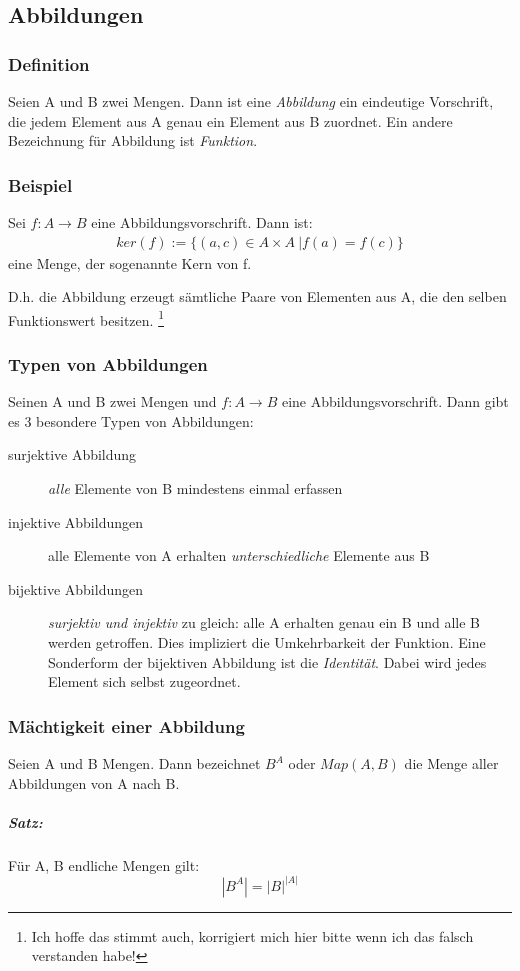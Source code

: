 \subsection{Abbildungen}

\subsubsection{Definition}
Seien A und B zwei Mengen.
Dann ist eine \emph{Abbildung} ein eindeutige Vorschrift, die jedem Element aus A genau ein Element aus B zuordnet.
Ein andere Bezeichnung für Abbildung ist \emph{Funktion}.
\subsubsection{Beispiel}
Sei $f:{A}\longrightarrow{B}$ eine Abbildungsvorschrift.
Dann ist:
\begin{align*}
   ker(f) := \{(a,c) \in A \times A\ | f(a)=f(c)\}
\end{align*}
eine Menge, der sogenannte Kern von f.

D.h. die Abbildung erzeugt sämtliche Paare von Elementen aus A, die den selben
Funktionswert besitzen. \footnote{Ich hoffe das stimmt auch, korrigiert mich hier bitte wenn
  ich das falsch verstanden habe!}
\newpage
\subsubsection{Typen von Abbildungen}
Seinen A und B zwei Mengen und $f:{A}\longrightarrow{B}$ eine Abbildungsvorschrift.
Dann gibt es 3 besondere Typen von Abbildungen:

\begin{description}
\item[surjektive Abbildung] \emph{alle} Elemente von B mindestens einmal erfassen
\item[injektive Abbildungen] alle Elemente von A erhalten \emph{unterschiedliche} Elemente aus B
\item[bijektive Abbildungen] \emph{surjektiv und injektiv} zu gleich: alle A erhalten genau ein B und alle B werden getroffen.
Dies impliziert die Umkehrbarkeit der Funktion. Eine Sonderform der bijektiven
Abbildung ist die \emph{Identität}. Dabei wird jedes Element sich selbst zugeordnet.
\end{description}

\begin{figure}
\hfill
{}\hfill
{}\hfill
{}
\end{figure}

\subsubsection{Mächtigkeit einer Abbildung}
Seien A und B Mengen.
Dann bezeichnet $B^A$ oder $Map(A,B)$ die Menge aller Abbildungen von A nach B.
\subparagraph*{Satz:}
Für A, B endliche Mengen gilt:
$$ |B^A| = {|B|}^{|A|} $$
